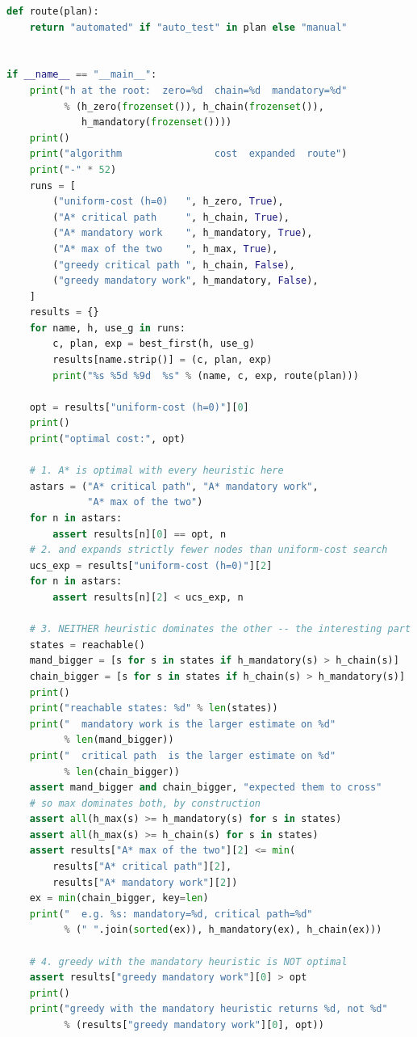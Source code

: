 \begin{lab}
\begin{lstlisting}[language=Python]
def route(plan):
    return "automated" if "auto_test" in plan else "manual"


if __name__ == "__main__":
    print("h at the root:  zero=%d  chain=%d  mandatory=%d"
          % (h_zero(frozenset()), h_chain(frozenset()),
             h_mandatory(frozenset())))
    print()
    print("algorithm                cost  expanded  route")
    print("-" * 52)
    runs = [
        ("uniform-cost (h=0)   ", h_zero, True),
        ("A* critical path     ", h_chain, True),
        ("A* mandatory work    ", h_mandatory, True),
        ("A* max of the two    ", h_max, True),
        ("greedy critical path ", h_chain, False),
        ("greedy mandatory work", h_mandatory, False),
    ]
    results = {}
    for name, h, use_g in runs:
        c, plan, exp = best_first(h, use_g)
        results[name.strip()] = (c, plan, exp)
        print("%s %5d %9d  %s" % (name, c, exp, route(plan)))

    opt = results["uniform-cost (h=0)"][0]
    print()
    print("optimal cost:", opt)

    # 1. A* is optimal with every heuristic here
    astars = ("A* critical path", "A* mandatory work",
              "A* max of the two")
    for n in astars:
        assert results[n][0] == opt, n
    # 2. and expands strictly fewer nodes than uniform-cost search
    ucs_exp = results["uniform-cost (h=0)"][2]
    for n in astars:
        assert results[n][2] < ucs_exp, n

    # 3. NEITHER heuristic dominates the other -- the interesting part
    states = reachable()
    mand_bigger = [s for s in states if h_mandatory(s) > h_chain(s)]
    chain_bigger = [s for s in states if h_chain(s) > h_mandatory(s)]
    print()
    print("reachable states: %d" % len(states))
    print("  mandatory work is the larger estimate on %d"
          % len(mand_bigger))
    print("  critical path  is the larger estimate on %d"
          % len(chain_bigger))
    assert mand_bigger and chain_bigger, "expected them to cross"
    # so max dominates both, by construction
    assert all(h_max(s) >= h_mandatory(s) for s in states)
    assert all(h_max(s) >= h_chain(s) for s in states)
    assert results["A* max of the two"][2] <= min(
        results["A* critical path"][2],
        results["A* mandatory work"][2])
    ex = min(chain_bigger, key=len)
    print("  e.g. %s: mandatory=%d, critical path=%d"
          % (" ".join(sorted(ex)), h_mandatory(ex), h_chain(ex)))

    # 4. greedy with the mandatory heuristic is NOT optimal
    assert results["greedy mandatory work"][0] > opt
    print()
    print("greedy with the mandatory heuristic returns %d, not %d"
          % (results["greedy mandatory work"][0], opt))


\end{lstlisting}
\end{lab}
